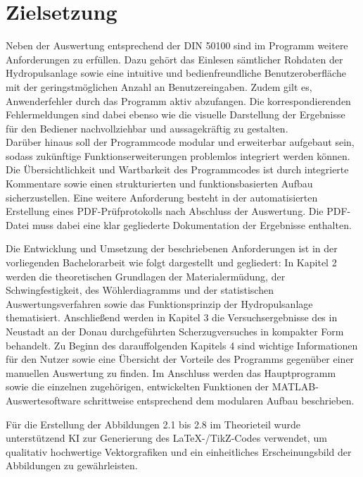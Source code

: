 	\section{Zielsetzung}
	Neben der Auswertung entsprechend der DIN 50100 sind im Programm weitere Anforderungen zu erfüllen. Dazu gehört das Einlesen sämtlicher Rohdaten der Hydropulsanlage sowie eine intuitive und bedienfreundliche Benutzeroberfläche mit der geringstmöglichen Anzahl an Benutzereingaben. Zudem gilt es, Anwenderfehler durch das Programm aktiv abzufangen. Die korrespondierenden Fehlermeldungen sind dabei ebenso wie die visuelle Darstellung der Ergebnisse für den Bediener nachvollziehbar und aussagekräftig zu gestalten.\\
	Darüber hinaus soll der Programmcode modular und erweiterbar aufgebaut sein, sodass zukünftige Funktionserweiterungen problemlos integriert werden können. Die Übersichtlichkeit und Wartbarkeit des Programmcodes ist durch integrierte Kommentare sowie einen strukturierten und funktionsbasierten Aufbau sicherzustellen. Eine weitere Anforderung besteht in der automatisierten Erstellung eines PDF-Prüfprotokolls nach Abschluss der Auswertung. Die PDF-Datei muss dabei eine klar gegliederte Dokumentation der Ergebnisse enthalten.
	
	Die Entwicklung und Umsetzung der beschriebenen Anforderungen ist in der vorliegenden Bachelorarbeit wie folgt dargestellt und gegliedert: 
	In Kapitel 2 werden die theoretischen Grundlagen der Materialermüdung, der Schwingfestigkeit, des Wöhlerdiagramms und der statistischen Auswertungsverfahren sowie das Funktionsprinzip der Hydropulsanlage thematisiert. Anschließend werden in Kapitel 3 die Versuchsergebnisse des in Neustadt an der Donau durchgeführten Scherzugversuches in kompakter Form behandelt. Zu Beginn des darauffolgenden Kapitels 4 sind wichtige Informationen für den Nutzer sowie eine Übersicht der Vorteile des Programms gegenüber einer manuellen Auswertung zu finden.
	Im Anschluss werden das Hauptprogramm sowie die einzelnen zugehörigen, entwickelten Funktionen der MATLAB-Auswertesoftware schrittweise entsprechend dem modularen Aufbau beschrieben.  
	
	Für die Erstellung der Abbildungen 2.1 bis 2.8 im Theorieteil wurde unterstützend KI zur Generierung des LaTeX-/TikZ-Codes verwendet, um qualitativ hochwertige Vektorgrafiken und ein einheitliches Erscheinungsbild der Abbildungen zu gewährleisten.





